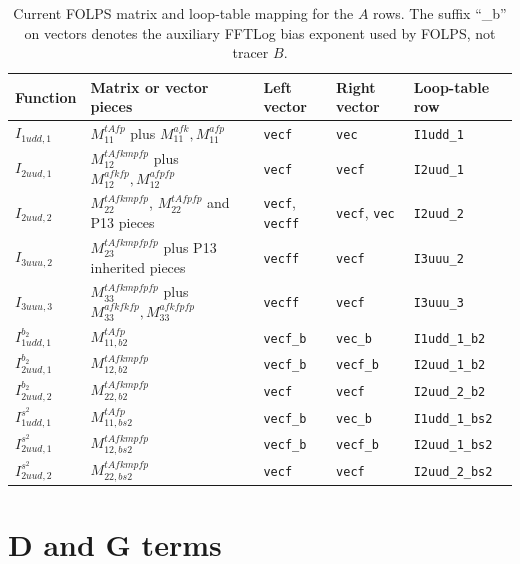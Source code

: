 \documentclass[11pt]{article}
\begin{document}
\begin{table}[p]
\centering
\footnotesize
\setlength{\tabcolsep}{3pt}
\caption{Current FOLPS matrix and loop-table mapping for the $A$ rows.  The
suffix ``\_b'' on vectors denotes the auxiliary FFTLog bias exponent used by
FOLPS, not tracer $B$.}
\label{tab:A-mapping}
\begin{tabular}{@{}L{0.18\textwidth}L{0.24\textwidth}L{0.13\textwidth}L{0.13\textwidth}L{0.19\textwidth}@{}}
\toprule
Function & Matrix or vector pieces & Left vector & Right vector & Loop-table row \\
\midrule
$I_{1udd,1}$ & $M^{tAfp}_{11}$ plus $M^{afk}_{11},M^{afp}_{11}$ & \texttt{vecf} & \texttt{vec} & \texttt{I1udd\_1} \\
$I_{2uud,1}$ & $M^{tAfkmpfp}_{12}$ plus $M^{afkfp}_{12},M^{afpfp}_{12}$ & \texttt{vecf} & \texttt{vecf} & \texttt{I2uud\_1} \\
$I_{2uud,2}$ & $M^{tAfkmpfp}_{22}$, $M^{tAfpfp}_{22}$ and P13 pieces & \texttt{vecf}, \texttt{vecff} & \texttt{vecf}, \texttt{vec} & \texttt{I2uud\_2} \\
$I_{3uuu,2}$ & $M^{tAfkmpfpfp}_{23}$ plus P13 inherited pieces & \texttt{vecff} & \texttt{vecf} & \texttt{I3uuu\_2} \\
$I_{3uuu,3}$ & $M^{tAfkmpfpfp}_{33}$ plus $M^{afkfkfp}_{33},M^{afkfpfp}_{33}$ & \texttt{vecff} & \texttt{vecf} & \texttt{I3uuu\_3} \\
$I_{1udd,1}^{b_2}$ & $M^{tAfp}_{11,b2}$ & \texttt{vecf\_b} & \texttt{vec\_b} & \texttt{I1udd\_1\_b2} \\
$I_{2uud,1}^{b_2}$ & $M^{tAfkmpfp}_{12,b2}$ & \texttt{vecf\_b} & \texttt{vecf\_b} & \texttt{I2uud\_1\_b2} \\
$I_{2uud,2}^{b_2}$ & $M^{tAfkmpfp}_{22,b2}$ & \texttt{vecf} & \texttt{vecf} & \texttt{I2uud\_2\_b2} \\
$I_{1udd,1}^{s^2}$ & $M^{tAfp}_{11,bs2}$ & \texttt{vecf\_b} & \texttt{vec\_b} & \texttt{I1udd\_1\_bs2} \\
$I_{2uud,1}^{s^2}$ & $M^{tAfkmpfp}_{12,bs2}$ & \texttt{vecf\_b} & \texttt{vecf\_b} & \texttt{I2uud\_1\_bs2} \\
$I_{2uud,2}^{s^2}$ & $M^{tAfkmpfp}_{22,bs2}$ & \texttt{vecf} & \texttt{vecf} & \texttt{I2uud\_2\_bs2} \\
\bottomrule
\end{tabular}
\end{table}

\section{D and G terms}
\end{document}
